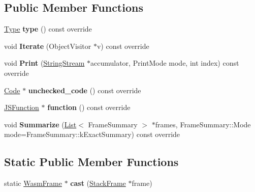 \subsection*{Public Member Functions}
\begin{DoxyCompactItemize}
\item 
\hyperlink{classv8_1_1internal_1_1_type}{Type} {\bfseries type} () const  override\hypertarget{classv8_1_1internal_1_1_wasm_frame_a8bc3feebf793f3a7ba78e1856b6aacbe}{}\label{classv8_1_1internal_1_1_wasm_frame_a8bc3feebf793f3a7ba78e1856b6aacbe}

\item 
void {\bfseries Iterate} (Object\+Visitor $\ast$v) const  override\hypertarget{classv8_1_1internal_1_1_wasm_frame_acfc41df040f28018c65a20f6b0675cf7}{}\label{classv8_1_1internal_1_1_wasm_frame_acfc41df040f28018c65a20f6b0675cf7}

\item 
void {\bfseries Print} (\hyperlink{classv8_1_1internal_1_1_string_stream}{String\+Stream} $\ast$accumulator, Print\+Mode mode, int index) const  override\hypertarget{classv8_1_1internal_1_1_wasm_frame_ae36fc5a189beb3034f7700ee09aa198e}{}\label{classv8_1_1internal_1_1_wasm_frame_ae36fc5a189beb3034f7700ee09aa198e}

\item 
\hyperlink{classv8_1_1internal_1_1_code}{Code} $\ast$ {\bfseries unchecked\+\_\+code} () const  override\hypertarget{classv8_1_1internal_1_1_wasm_frame_a9e04b80549ee8162c6963047839a4b39}{}\label{classv8_1_1internal_1_1_wasm_frame_a9e04b80549ee8162c6963047839a4b39}

\item 
\hyperlink{classv8_1_1internal_1_1_j_s_function}{J\+S\+Function} $\ast$ {\bfseries function} () const  override\hypertarget{classv8_1_1internal_1_1_wasm_frame_aff8c76bd0e16f90287c9d040797048ba}{}\label{classv8_1_1internal_1_1_wasm_frame_aff8c76bd0e16f90287c9d040797048ba}

\item 
void {\bfseries Summarize} (\hyperlink{classv8_1_1internal_1_1_list}{List}$<$ Frame\+Summary $>$ $\ast$frames, Frame\+Summary\+::\+Mode mode=Frame\+Summary\+::k\+Exact\+Summary) const  override\hypertarget{classv8_1_1internal_1_1_wasm_frame_aa672240849a1457153f0f93518e365ed}{}\label{classv8_1_1internal_1_1_wasm_frame_aa672240849a1457153f0f93518e365ed}

\end{DoxyCompactItemize}
\subsection*{Static Public Member Functions}
\begin{DoxyCompactItemize}
\item 
static \hyperlink{classv8_1_1internal_1_1_wasm_frame}{Wasm\+Frame} $\ast$ {\bfseries cast} (\hyperlink{classv8_1_1_stack_frame}{Stack\+Frame} $\ast$frame)\hypertarget{classv8_1_1internal_1_1_wasm_frame_a594d4dd9a289d043e030fecbb84106b2}{}\label{classv8_1_1internal_1_1_wasm_frame_a594d4dd9a289d043e030fecbb84106b2}

\end{DoxyCompactItemize}
